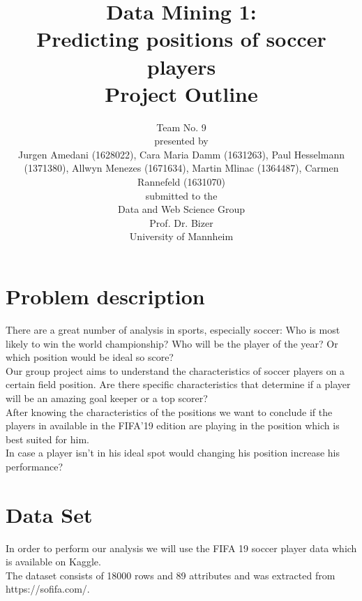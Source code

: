 \documentclass[runningheads]{llncs}
\begin{document}
%
\title{Data Mining 1: \\
Predicting positions of soccer players  \\
Project Outline}


\vspace{2cm}
\author{Team No. 9\\
\vspace{1cm}
presented by\\
Jurgen Amedani (1628022), Cara Maria Damm (1631263), Paul Hesselmann (1371380), Allwyn Menezes (1671634), Martin Mlinac (1364487), Carmen Rannefeld (1631070)\\
\vspace{1cm}
submitted to the \\
Data and Web Science Group\\
Prof. Dr. Bizer\\
University of Mannheim}

\maketitle              %
\newpage
\section{Problem description}
There are a great number of analysis in sports, especially soccer: Who is most likely to win the world championship? Who will be the player of the year? Or which position would be ideal so score? \\

Our group project aims to understand the characteristics of soccer players on a certain field position. Are there specific characteristics that determine if a player will be an amazing goal keeper or a top scorer?\\
After knowing the characteristics of the positions we want to conclude if the players in available in the FIFA'19 edition are playing in the position which is best suited for him.\\
In case a player isn't in his ideal spot would changing his position increase his performance?


\section{Data Set}
In order to perform our analysis we will use the FIFA 19 soccer player data which is available on Kaggle.\\
The dataset consists of 18000 rows and 89 attributes and was extracted from https://sofifa.com/.
\end{document}
